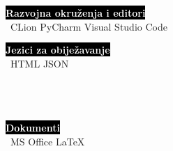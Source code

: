 \documentclass[9pt]{developercv} %
\begin{document}
\begin{minipage}[t]{0.4\textwidth}
	\vspace{-\baselineskip}
	
	\colorbox{black}{{\textcolor{white}{\textbf{Razvojna okruženja i editori}}}}\smallskip\\\
	{CLion} \hspace{10} {PyCharm} \hspace{10} {Visual Studio Code}\smallskip\\
\end{minipage}
\hfill
\begin{minipage}[t]{0.3\textwidth}
	\vspace{-\baselineskip}
	
	\colorbox{black}{{\textcolor{white}{\textbf{Jezici za obiježavanje}}}}\smallskip\\\
	{HTML} \hspace{10} {JSON}\smallskip\\\\\\\
\end{minipage}
\hfill
\begin{minipage}[t]{0.2\textwidth}
	\vspace{-\baselineskip}
	
	\colorbox{black}{{\textcolor{white}{\textbf{Dokumenti}}}}\smallskip\\\
	{MS Office} \hspace{10} {LaTeX}\\
\end{minipage}

\end{document}

